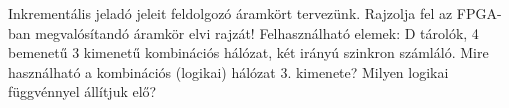 \begin{example}

Inkrementális jeladó jeleit feldolgozó áramkört tervezünk. Rajzolja fel az FPGA-ban megvalósítandó áramkör elvi rajzát! Felhasználható elemek: D tárolók, 4 bemenetű 3 kimenetű kombinációs hálózat, két irányú szinkron számláló. Mire használható a kombinációs (logikai) hálózat 3. kimenete? Milyen logikai függvénnyel állítjuk elő?

\tcbline
\vspace{1mm}

\solution

\end{example}